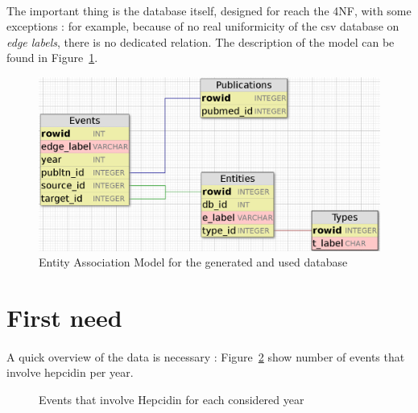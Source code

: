\documentclass{report} %
\begin{document}
        \paragraph*{}
        The important thing is the database itself, designed for reach the 4NF, with some exceptions : 
        for example, because of no real uniformicity of the csv database on \textit{edge labels}, there is no dedicated relation.
        The description of the model can be found in Figure~\ref{fig:mea}.
        \begin{center}
        \end{center}
        \begin{figure}[H] 
                \centering
                \includegraphics[width=1.0\textwidth]{images/MEA.png}
                \caption{Entity Association Model for the generated and used database}
                \label{fig:mea}
        \end{figure}      




\newpage
\section{First need}
    \paragraph*{}
    A quick overview of the data is necessary : Figure~\ref{fig:eventperyear} show number of events that involve hepcidin per year.
    \begin{figure}[H] 
      \centering
      \caption{Events that involve Hepcidin for each considered year}
      \label{fig:eventperyear}
    \end{figure}
\end{document}
